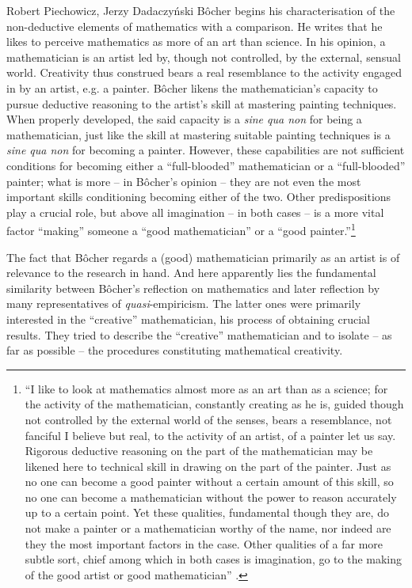\begin{artengenv}{Robert Piechowicz, Jerzy Dadaczyński}
Bôcher begins his characterisation of the non-deductive elements of mathematics with a comparison. He writes that he likes to perceive mathematics as more of an art than science. In his opinion, a mathematician is an artist led by, though not controlled, by the external, sensual world. Creativity thus construed bears a real resemblance to the activity engaged in by an artist, e.g. a painter. Bôcher likens the mathematician's capacity to pursue deductive reasoning to the artist's skill at mastering painting techniques. When properly developed, the said capacity is a \textit{sine qua non} for being a mathematician, just like the skill at mastering suitable painting techniques is a \textit{sine qua non} for becoming a painter. However, these capabilities are not sufficient conditions for becoming either a ``full-blooded'' mathematician or a ``full-blooded'' painter; what is more -- in Bôcher's opinion -- they are not even the most important skills conditioning becoming either of the two. Other predispositions play a crucial role, but above all imagination -- in both cases -- is a more vital factor ``making'' someone a ``good mathematician'' or a ``good painter.''\footnote{``I like to look at mathematics almost more as an art than as a science; for the activity of the mathematician, constantly creating as he is, guided though not controlled by the external world of the senses, bears a resemblance, not fanciful I believe but real, to the activity of an artist, of a painter let us say. Rigorous deductive reasoning on the part of the mathematician may be likened here to technical skill in drawing on the part of the painter. Just as no one can become a good painter without a certain amount of this skill, so no one can become a mathematician without the power to reason accurately up to a certain point. Yet these qualities, fundamental though they are, do not make a painter or a mathematician worthy of the name, nor indeed are they the most important factors in the case. Other qualities of a far more subtle sort, chief among which in both cases is imagination, go to the making of the good artist or good mathematician''
\parencite[][p.133]{bocher_fundamental_1904}.%
}

The fact that Bôcher regards a (good) mathematician primarily as an artist is of relevance to the research in hand. And here apparently lies the fundamental similarity between Bôcher's reflection on mathematics and later reflection by many representatives of \textit{quasi}-empiricism. The latter ones were primarily interested in the ``creative'' mathematician, his process of obtaining crucial results. They tried to describe the ``creative'' mathematician and to isolate -- as far as possible -- the procedures constituting mathematical creativity.


\end{artengenv}
